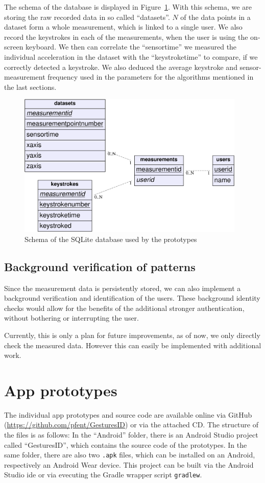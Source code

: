 The schema of the database is displayed in Figure~\ref{fig:dbschema}. With this schema, we are  storing the raw recorded data in so called ``datasets''. $N$ of the data points in a dataset form a whole measurement, which is linked to a single user. We also record the keystrokes in each of the measurements, when the user is using the on-screen keyboard. We then can correlate the ``sensortime'' we measured the individual acceleration in the dataset with the ``keystroketime'' to compare, if we correctly detected a keystroke. We also deduced the average keystroke and sensor-measurement frequency used in the parameters for the algorithms mentioned in the last sections.
\begin{figure}
    \centering
    \includegraphics[width=0.97\textwidth]{figures/databaseschema.png}
    \caption{Schema of the SQLite database used by the prototypes}
    \label{fig:dbschema}
\end{figure}

\subsection{Background verification of patterns}
Since the measurement data is persistently stored, we can also implement a background verification and identification of the users. These background identity checks would allow for the benefits of the additional stronger authentication, without bothering or interrupting the user.

Currently, this is only a plan for future improvements, as of now, we only directly check the measured data. However this can easily be implemented with additional work.
\section{App prototypes}
The individual app prototypes and source code are available online via GitHub (\url{https://github.com/pfent/GesturesID}) or via the attached CD. The structure of the files is as follows: In the ``Android'' folder, there is an Android Studio project called ``GesturesID'', which contains the source code of the prototypes. In the same folder, there are also two \lstinline$.apk$ files, which can be installed on an Android, respectively an Android Wear device. This project can be built via the Android Studio \gls{ide} or via evecuting the Gradle wrapper script \lstinline$gradlew$.

